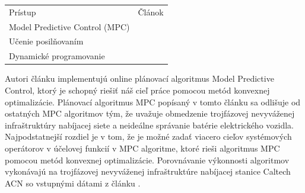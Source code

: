 
\begin{table}[H]
    \begin{tabular}{ll}
    Prístup                        & Článok \\
    Model Predictive Control (MPC) &      \cite{Lee2018LargeScaleAE}      \\
    Učenie posilňovaním            &   \cite{rl_costmin_1}        \\
    Dynamické programovanie        &   \cite{Zhang2018RealTimeSC}
    \end{tabular}
    \end{table}


    Autori článku \cite{Lee2018LargeScaleAE} implementujú online plánovací algoritmus Model Predictive Control, ktorý je schopný riešiť náš cieľ práce pomocou metód konvexnej optimalizácie. Plánovací algoritmus MPC popísaný v tomto článku sa odlišuje od ostatných MPC algoritmov tým, že uvažuje obmedzenie trojfázovej nevyváženej infraštruktúry nabíjacej siete a neideálne správanie batérie elektrického vozidla. Najpodstatnejší rozdiel je v tom, že je možné zadať viacero cieľov systémových operátorov v účelovej funkcií v MPC algoritme, ktoré rieši algoritmus MPC pomocou metód konvexnej optimalizácie. Porovnávanie výkonnosti algoritmov vykonávajú na trojfázovej nevyváženej infraštruktúre nabíjacej stanice Caltech ACN so vstupnými dátami z článku \cite{acndata}.
    


